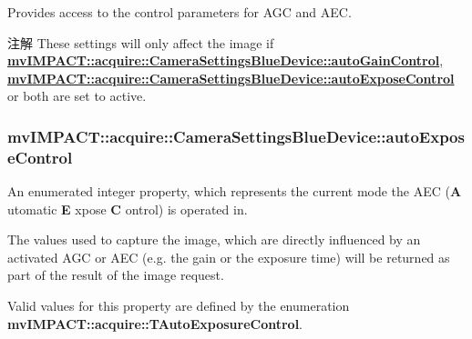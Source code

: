 Provides access to the control parameters for A\+G\+C and A\+E\+C. 

\begin{DoxyNote}{注解}
These settings will only affect the image if {\bfseries \hyperlink{classmv_i_m_p_a_c_t_1_1acquire_1_1_camera_settings_blue_device_a9d65d62f763438188309c1807b7fc436}{mv\+I\+M\+P\+A\+C\+T\+::acquire\+::\+Camera\+Settings\+Blue\+Device\+::auto\+Gain\+Control}}, {\bfseries \hyperlink{classmv_i_m_p_a_c_t_1_1acquire_1_1_camera_settings_blue_device_a42cf7abb4f526ee88e74e040a3c9c3ba}{mv\+I\+M\+P\+A\+C\+T\+::acquire\+::\+Camera\+Settings\+Blue\+Device\+::auto\+Expose\+Control}} or both are set to active. 
\end{DoxyNote}
\hypertarget{classmv_i_m_p_a_c_t_1_1acquire_1_1_camera_settings_blue_device_a42cf7abb4f526ee88e74e040a3c9c3ba}{
\subsubsection[{auto\+Expose\+Control}]{ mv\+I\+M\+P\+A\+C\+T\+::acquire\+::\+Camera\+Settings\+Blue\+Device\+::auto\+Expose\+Control}}\label{classmv_i_m_p_a_c_t_1_1acquire_1_1_camera_settings_blue_device_a42cf7abb4f526ee88e74e040a3c9c3ba}


An enumerated integer property, which represents the current mode the A\+E\+C ({\bfseries A} utomatic {\bfseries E} xpose {\bfseries C} ontrol) is operated in. 

The values used to capture the image, which are directly influenced by an activated A\+G\+C or A\+E\+C (e.\+g. the gain or the exposure time) will be returned as part of the result of the image request.

Valid values for this property are defined by the enumeration {\bfseries mv\+I\+M\+P\+A\+C\+T\+::acquire\+::\+T\+Auto\+Exposure\+Control}.


